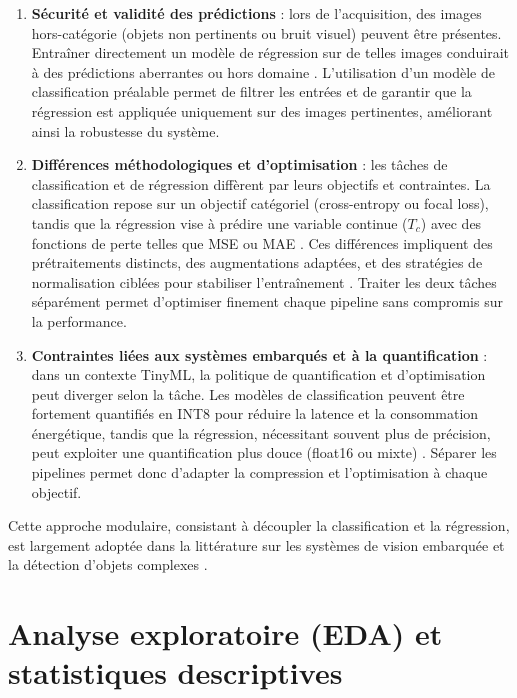 \begin{enumerate}
    \item \textbf{Sécurité et validité des prédictions} : lors de l'acquisition, des images hors-catégorie (objets non pertinents ou bruit visuel) peuvent être présentes. Entraîner directement un modèle de régression sur de telles images conduirait à des prédictions aberrantes ou hors domaine \cite{zhang2018generalized}. L'utilisation d'un modèle de classification préalable permet de filtrer les entrées et de garantir que la régression est appliquée uniquement sur des images pertinentes, améliorant ainsi la robustesse du système.
    
    \item \textbf{Différences méthodologiques et d'optimisation} : les tâches de classification et de régression diffèrent par leurs objectifs et contraintes. La classification repose sur un objectif catégoriel (cross-entropy ou focal loss), tandis que la régression vise à prédire une variable continue (\(T_c\)) avec des fonctions de perte telles que MSE ou MAE \cite{goodfellow2016deep}. Ces différences impliquent des prétraitements distincts, des augmentations adaptées, et des stratégies de normalisation ciblées pour stabiliser l’entraînement \cite{lecun2015deep}. Traiter les deux tâches séparément permet d’optimiser finement chaque pipeline sans compromis sur la performance.
    
    \item \textbf{Contraintes liées aux systèmes embarqués et à la quantification} : dans un contexte TinyML, la politique de quantification et d’optimisation peut diverger selon la tâche. Les modèles de classification peuvent être fortement quantifiés en INT8 pour réduire la latence et la consommation énergétique, tandis que la régression, nécessitant souvent plus de précision, peut exploiter une quantification plus douce (float16 ou mixte) \cite{han2020tinyml}. Séparer les pipelines permet donc d’adapter la compression et l’optimisation à chaque objectif.
\end{enumerate}

Cette approche modulaire, consistant à découpler la classification et la régression, est largement adoptée dans la littérature sur les systèmes de vision embarquée et la détection d’objets complexes \cite{redmon2016you,liu2016ssd}.


\section{Analyse exploratoire (EDA) et statistiques descriptives}


